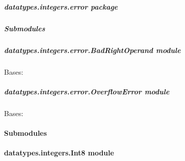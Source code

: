 \documentclass[letterpaper,10pt,english]{sphinxmanual}
\begin{document}
\subparagraph{datatypes.integers.error package}
\label{datatypes.integers.error::doc}\label{datatypes.integers.error:datatypes-integers-error-package}

\subparagraph{Submodules}
\label{datatypes.integers.error:submodules}

\subparagraph{datatypes.integers.error.BadRightOperand module}
\label{datatypes.integers.error:module-datatypes.integers.error.BadRightOperand}\label{datatypes.integers.error:datatypes-integers-error-badrightoperand-module}

\begin{fulllineitems}
\label{datatypes.integers.error:datatypes.integers.error.BadRightOperand.BadRightOperand}
Bases: 

\end{fulllineitems}



\subparagraph{datatypes.integers.error.OverflowError module}
\label{datatypes.integers.error:datatypes-integers-error-overflowerror-module}\label{datatypes.integers.error:module-datatypes.integers.error.OverflowError}

\begin{fulllineitems}
\label{datatypes.integers.error:datatypes.integers.error.OverflowError.OverflowError}
Bases: 

\end{fulllineitems}



\paragraph{Submodules}
\label{datatypes.integers:submodules}

\paragraph{datatypes.integers.Int8 module}
\label{datatypes.integers:module-datatypes.integers.Int8}\label{datatypes.integers:datatypes-integers-int8-module}
\end{document}
